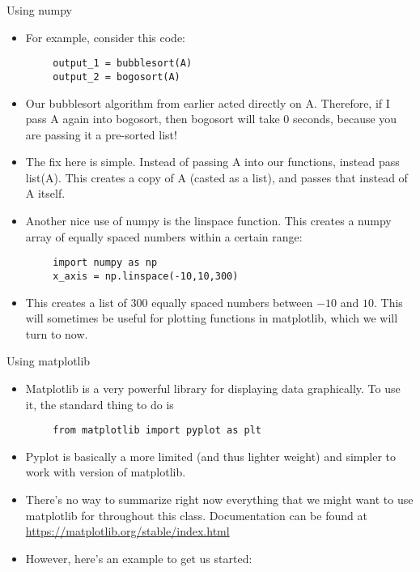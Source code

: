 \documentclass{beamer}
\begin{document}
\begin{frame}[fragile]{Using numpy}
    \begin{itemize}
        \item For example, consider this code:
    \end{itemize}
    \begin{verbatim}
        output_1 = bubblesort(A)
        output_2 = bogosort(A)
    \end{verbatim}
    \begin{itemize}
        \item Our bubblesort algorithm from earlier acted directly on A. Therefore, if I pass A again into bogosort, then bogosort will take 0 seconds, because you are passing it a pre-sorted list!
        \item The fix here is simple. Instead of passing A into our functions, instead pass list(A). This creates a copy of A (casted as a list), and passes that instead of A itself. 
        \item Another nice use of numpy is the linspace function. This creates a numpy array of equally spaced numbers within a certain range:
    \end{itemize}
    \begin{verbatim}
        import numpy as np
        x_axis = np.linspace(-10,10,300)
    \end{verbatim}
    \begin{itemize}
        \item This creates a list of 300 equally spaced numbers between $-10$ and $10$. This will sometimes be useful for plotting functions in matplotlib, which we will turn to now. 
    \end{itemize}
\end{frame}

\begin{frame}[fragile]{Using matplotlib}
    \begin{itemize}
        \item Matplotlib is a very powerful library for displaying data graphically. To use it, the standard thing to do is
    \end{itemize}
    \begin{verbatim}
        from matplotlib import pyplot as plt
    \end{verbatim}
    \begin{itemize}
        \item Pyplot is basically a more limited (and thus lighter weight) and simpler to work with version of matplotlib.
        \item There's no way to summarize right now everything that we might want to use matplotlib for throughout this class. Documentation can be found at \url{https://matplotlib.org/stable/index.html}
        \item However, here's an example to get us started:
    \end{itemize}
\end{frame}
\end{document}
